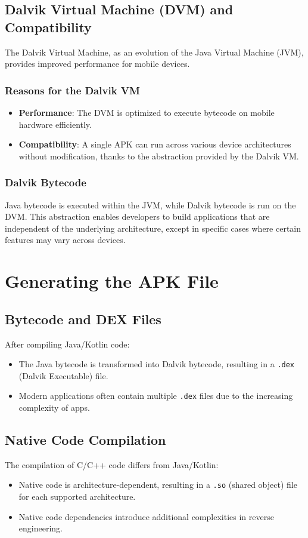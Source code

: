 \documentclass{article}
\begin{document}
\subsection{Dalvik Virtual Machine (DVM) and Compatibility}
The Dalvik Virtual Machine, as an evolution of the Java Virtual Machine (JVM), provides improved performance for mobile devices.

\subsubsection{Reasons for the Dalvik VM}
\begin{itemize}
    \item \textbf{Performance}: The DVM is optimized to execute bytecode on mobile hardware efficiently.
    \item \textbf{Compatibility}: A single APK can run across various device architectures without modification, thanks to the abstraction provided by the Dalvik VM.
\end{itemize}

\subsubsection{Dalvik Bytecode}
Java bytecode is executed within the JVM, while Dalvik bytecode is run on the DVM. This abstraction enables developers to build applications that are independent of the underlying architecture, except in specific cases where certain features may vary across devices.

\section{Generating the APK File}
\subsection{Bytecode and DEX Files}
After compiling Java/Kotlin code:
\begin{itemize}
    \item The Java bytecode is transformed into Dalvik bytecode, resulting in a \texttt{.dex} (Dalvik Executable) file.
    \item Modern applications often contain multiple \texttt{.dex} files due to the increasing complexity of apps.
\end{itemize}

\subsection{Native Code Compilation}
The compilation of C/C++ code differs from Java/Kotlin:
\begin{itemize}
    \item Native code is architecture-dependent, resulting in a \texttt{.so} (shared object) file for each supported architecture.
    \item Native code dependencies introduce additional complexities in reverse engineering.
\end{itemize}
\end{document}
